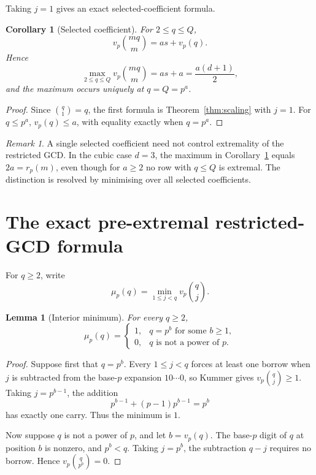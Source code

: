 \documentclass[11pt]{article}
\newtheorem{lemma}[theorem]{Lemma}
\newtheorem{corollary}[theorem]{Corollary}
\theoremstyle{definition}
\theoremstyle{remark}
\newtheorem{remark}[theorem]{Remark}
\begin{document}
Taking \(j=1\) gives an exact selected-coefficient formula.

\begin{corollary}[Selected coefficient]\label{cor:selected}
For \(2\le q\le Q\),
\[
  v_p\binom{mq}{m}=as+v_p(q).
\]
Hence
\[
  \max_{2\le q\le Q}v_p\binom{mq}{m}
  =
  as+a
  =
  \frac{a(d+1)}2,
\]
and the maximum occurs uniquely at \(q=Q=p^a\).
\end{corollary}

\begin{proof}
Since \(\binom q1=q\), the first formula is
Theorem~\ref{thm:scaling} with \(j=1\).  For \(q\le p^a\),
\(v_p(q)\le a\), with equality exactly when \(q=p^a\).
\end{proof}

\begin{remark}\label{rem:selected-not-gcd}
A single selected coefficient need not control extremality of the restricted
GCD.  In the cubic case \(d=3\), the maximum in
Corollary~\ref{cor:selected} equals \(2a=r_p(m)\), even though for \(a\ge2\)
no row with \(q\le Q\) is extremal.  The distinction is resolved by minimising
over all selected coefficients.
\end{remark}

\section{The exact pre-extremal restricted-GCD formula}
\label{sec:gcdwindow}

For \(q\ge2\), write
\[
  \mu_p(q)=\min_{1\le j<q}v_p\binom qj.
\]

\begin{lemma}[Interior minimum]\label{lem:mu}
For every \(q\ge2\),
\[
  \mu_p(q)=
  \begin{cases}
    1,&q=p^b\text{ for some }b\ge1,\\
    0,&q\text{ is not a power of }p.
  \end{cases}
\]
\end{lemma}

\begin{proof}
Suppose first that \(q=p^b\).  Every \(1\le j<q\) forces at least one borrow
when \(j\) is subtracted from the base-\(p\) expansion \(10\cdots0\), so
Kummer gives \(v_p\binom qj\ge1\).  Taking \(j=p^{b-1}\), the addition
\[
  p^{b-1}+(p-1)p^{b-1}=p^b
\]
has exactly one carry.  Thus the minimum is \(1\).

Now suppose \(q\) is not a power of \(p\), and let \(b=v_p(q)\).  The base-\(p\)
digit of \(q\) at position \(b\) is nonzero, and \(p^b<q\).  Taking
\(j=p^b\), the subtraction \(q-j\) requires no borrow.  Hence
\(v_p\binom q{p^b}=0\).
\end{proof}
\end{document}
